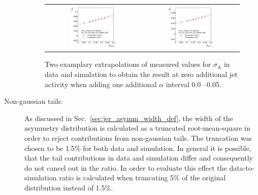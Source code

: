 \begin{description}
\begin{figure}[!tp]
  \centering
  \begin{tabular}{cc}
                \includegraphics[width=0.49\textwidth]{figures/Extrapol_Eta0_pt4_final_nominal_NoMinPtCutForThirdJet_AddNewAlphaBin_v4.pdf} &
                \includegraphics[width=0.49\textwidth]{figures/Extrapol_Eta0_pt9_final_nominal_NoMinPtCutForThirdJet_AddNewAlphaBin_v4.pdf}
  \end{tabular}
  \caption{Two examplary extrapolations of measured values for $\sigma_\mathrm{A}$ in data and simulation to obtain the result at zero additional jet activity when adding one additional $\alpha$ interval 0.0 --0.05.}
  \label{fig:syst_uncert_alpha_range}
\end{figure}

\item[Non-gaussian tails:] As discussed in Sec.~\ref{sec:jer_asymm_width_def}, the width of the asymmetry distribution is calculated as a truncated root-mean-square in order to reject contributions from non-gaussian tails. The truncation was chosen to be 1.5\% for both data and simulation. In general it is possible, that the tail contributions in data and simulation differ and consequently do not cancel out in the ratio. In order to evaluate this effect the data-to-simulation ratio is calculated when truncating 5\% of the original distribution instead of 1.5\%.  


\end{description}
